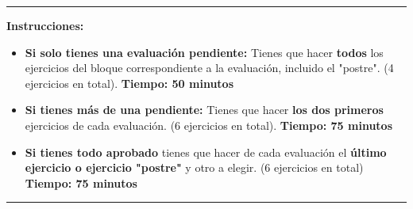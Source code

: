 \documentclass[addpoints,spanish, 12pt,a4paper]{exam}
\newcommand{\timelimit}{80 minutos}
\newcommand{\tipo}{A}\newcommand{\examnum}{Examen Global}
\begin{document}
\begin{center}
\rule[2ex]{\textwidth}{2pt}        
\textbf{Instrucciones:} \begin{itemize}
\item \textbf{Si solo tienes una evaluación pendiente:} Tienes que hacer \textbf{todos} los ejercicios del bloque correspondiente a la evaluación, incluido el "postre". (4 ejercicios en total). \textbf{Tiempo: 50 minutos}
\item \textbf{Si tienes más de una pendiente:} Tienes que hacer \textbf{los dos primeros} ejercicios de cada evaluación. (6 ejercicios en total). \textbf{Tiempo: 75 minutos}
\item \textbf{Si tienes todo aprobado} tienes que hacer de cada evaluación el \textbf{último ejercicio o ejercicio "postre"} y otro a elegir. (6 ejercicios en total) \textbf{Tiempo: 75 minutos}
\end{itemize}
\rule[2ex]{\textwidth}{2pt}
\end{center}

        
        
        
%       
%
%
%
\end{document}
